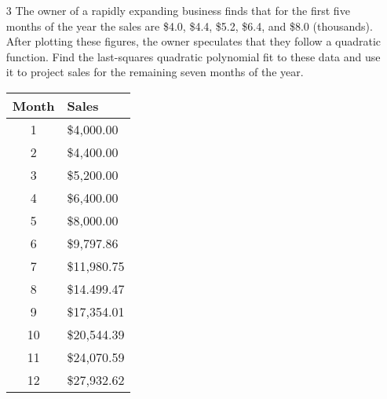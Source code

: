 \documentclass[12pt]{article}
\theoremstyle{definition}
\theoremstyle{plain}
\begin{document}
\begin{enumerate}
\item[3]The owner of a rapidly expanding business finds that for the first five months of the year the sales are \$4.0, \$4.4, \$5.2, \$6.4, and \$8.0 (thousands). After plotting these figures, the owner speculates that they follow a quadratic function. Find the last-squares quadratic polynomial fit to these data and use it to project sales for the remaining seven months of the year.
	\begin{center}
	\begin{tabular}{c|l}
	Month&Sales\\
	\hline
	1&\$4,000.00\\
	2&\$4,400.00\\
	3&\$5,200.00\\
	4&\$6,400.00\\
	5&\$8,000.00\\
	6&\$9,797.86\\
	7&\$11,980.75\\
	8&\$14.499.47\\
	9&\$17,354.01\\
	10&\$20,544.39\\
	11&\$24,070.59\\
	12&\$27,932.62\\
	\end{tabular}
	\end{center}


\end{enumerate}
\end{document}
